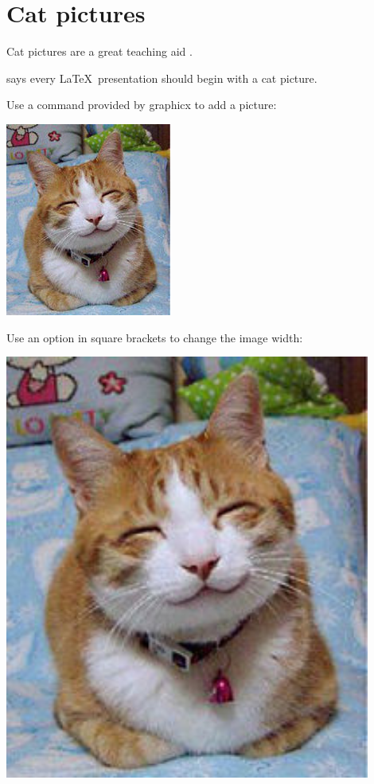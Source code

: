 \section{Cat pictures}
\label{sec:cats}

Cat pictures are a great teaching aid \citep{smith2016}. %

\citet{smith2016} says every \LaTeX\ presentation should begin with a cat picture. %

Use a command provided by graphicx to add a picture:

\includegraphics{figures/cat.jpg}

Use an option in square brackets to change the image width:

\includegraphics[width=0.9\textwidth]{figures/cat.jpg}

